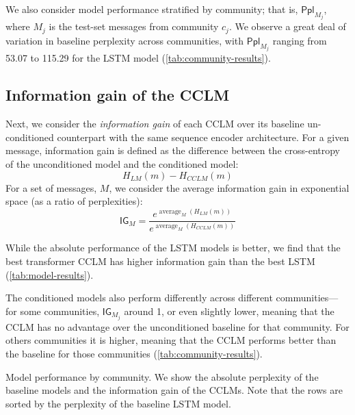 \documentclass[11pt,a4paper]{article}
\newcommand\jp[1]{\todo[backgroundcolor=blue!10]{JP: #1}}
\newcommand\Ppl{\mathsf{Ppl}}
\newcommand\IG{\mathsf{IG}}
\DeclareMathOperator*{\avg}{average}
\begin{document}
We also consider model performance stratified by community;
that is, $\Ppl_{M_j}$, where $M_j$ is the test-set messages from community $c_j$.
We observe a great deal of variation in baseline perplexity across communities,
with $\Ppl_{M_j}$ ranging from \num{53.07} to \num{115.29} for the LSTM model
(\cref{tab:community-results}). 

\subsection{Information gain of the CCLM}

Next, we consider the \emph{information gain} of each CCLM over its baseline
un-conditioned counterpart with the same sequence encoder architecture.
For a given message, information gain is defined as the difference
between the cross-entropy of the unconditioned model and the conditioned model:
\[H_{LM}(m) - H_{CCLM}(m)\]
For a set of messages, $M$, we consider the average information gain
in exponential space (as a ratio of perplexities):
\[\IG_M = \frac{e^{\avg_M(H_{LM}(m))}}{e^{\avg_M(H_{CCLM}(m))}}\]


While the absolute performance of the LSTM models is better,
we find that the best transformer CCLM has higher information gain 
than the best LSTM (\cref{tab:model-results}).

The conditioned models also perform differently across different communities---%
for some communities, $\IG_{M_j}$ around \num{1}, or even slightly lower,
meaning that the CCLM has no advantage over the unconditioned baseline for that community.
For others communities it is higher, meaning that the CCLM performs better than 
the baseline for those communities (\cref{tab:community-results}).

\begin{table*}
  \normalsize
  \centering
  
  \caption{
    Model performance by community. We show the absolute perplexity 
    of the baseline models and the information gain of the CCLMs.
    Note that the rows are sorted by the perplexity of the baseline
    LSTM model.
}
  \label{tab:community-results}
\end{table*}
\end{document}
